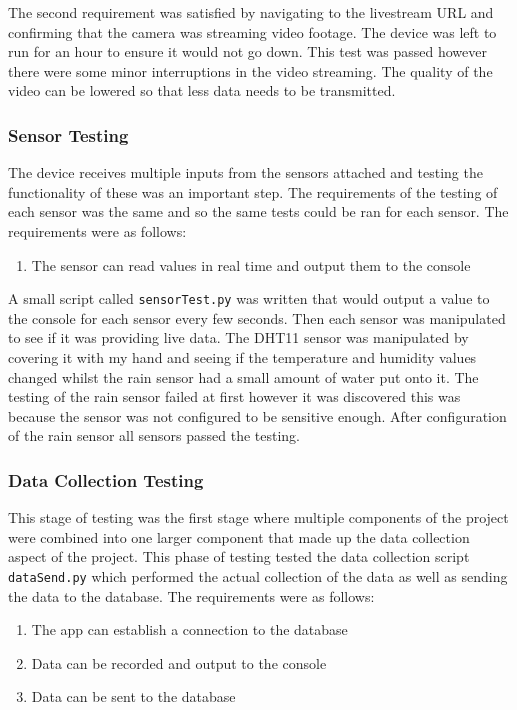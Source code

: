 \documentclass[10pt,a4paper]{article}
\begin{document}
The second requirement was satisfied by navigating to the livestream URL and confirming that the camera was streaming video footage. The device was left to run for an hour to ensure it would not go down. This test was passed however there were some minor interruptions in the video streaming. The quality of the video can be lowered so that less data needs to be transmitted. 

\subsubsection{Sensor Testing}
The device receives multiple inputs from the sensors attached and testing the functionality of these was an important step. The requirements of the testing of each sensor was the same and so the same tests could be ran for each sensor. The requirements were as follows:
\begin{enumerate}
  \item The sensor can read values in real time and output them to the console
\end{enumerate}

A small script called \texttt{sensorTest.py} was written that would output a value to the console for each sensor every few seconds. Then each sensor was manipulated to see if it was providing live data. The DHT11 sensor was manipulated by covering it with my hand and seeing if the temperature and humidity values changed whilst the rain sensor had a small amount of water put onto it. The testing of the rain sensor failed at first however it was discovered this was because the sensor was not configured to be sensitive enough. After configuration of the rain sensor all sensors passed the testing. 

\subsubsection{Data Collection Testing}
This stage of testing was the first stage where multiple components of the project were combined into one larger component that made up the data collection aspect of the project. This phase of testing tested the data collection script \texttt{dataSend.py} which performed the actual collection of the data as well as sending the data to the database. The requirements were as follows: 

\begin{enumerate}
  \item The app can establish a connection to the database
  \item Data can be recorded and output to the console
  \item Data can be sent to the database
\end{enumerate}
\end{document}
